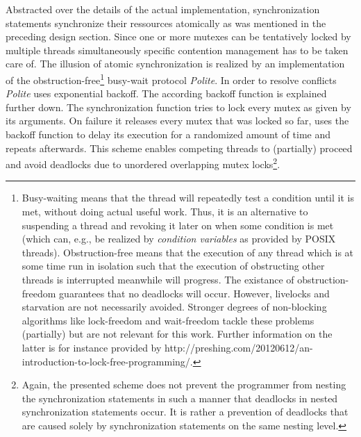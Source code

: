 Abstracted over the details of the actual implementation, synchronization statements synchronize their ressources atomically as was mentioned in the preceding design section. Since one or more mutexes can be tentatively locked by multiple threads simultaneously specific contention management has to be taken care of. The illusion of atomic synchronization is realized by an implementation of the obstruction-free\footnote{Busy-waiting means that the thread will repeatedly test a condition until it is met, without doing actual useful work\cite[p.~166]{AnIntroductionToParallelProgramming}. Thus, it is an alternative to suspending a thread and revoking it later on when some condition is met (which can, e.g., be realized by \textit{condition variables} as provided by POSIX threads\cite[p.~77]{ProgrammingWithPOSIXThreads}). Obstruction-free means that the execution of any thread which is at some time run in isolation such that the execution of obstructing other threads is interrupted meanwhile will progress. The existance of obstruction-freedom guarantees that no deadlocks will occur\cite{ObstructionFreeAuthorizationEnforcement}. However, livelocks and starvation are not necessarily avoided. Stronger degrees of non-blocking algorithms like lock-freedom and wait-freedom tackle these problems (partially) but are not relevant for this work. Further information on the latter is for instance provided by http://preshing.com/20120612/an-introduction-to-lock-free-programming/. %
} busy-wait protocol \textit{Polite}. In order to resolve conflicts \textit{Polite} uses exponential backoff. The according backoff function is explained further down. The synchronization function tries to lock every mutex as given by its arguments. On failure it releases every mutex that was locked so far, uses the backoff function to delay its execution for a randomized amount of time and repeats afterwards. This scheme enables competing threads to (partially) proceed and avoid deadlocks due to unordered overlapping mutex locks\footnote{Again, the presented scheme does not prevent the programmer from nesting the synchronization statements in such a manner that deadlocks in nested synchronization statements occur. It is rather a prevention of deadlocks that are caused solely by synchronization statements on the same nesting level.}.
